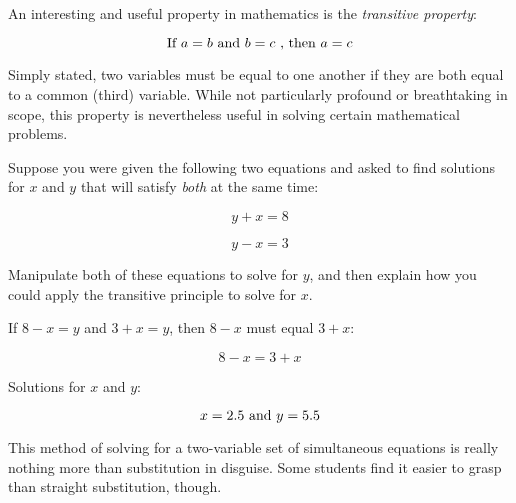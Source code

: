 

An interesting and useful property in mathematics is the {\it transitive property}:

$$\hbox{If } a = b \hbox{ and } b = c \hbox{ , then } a = c$$

Simply stated, two variables must be equal to one another if they are both equal to a common (third) variable.  While not particularly profound or breathtaking in scope, this property is nevertheless useful in solving certain mathematical problems.

\vskip 10pt

Suppose you were given the following two equations and asked to find solutions for $x$ and $y$ that will satisfy {\it both} at the same time:

$$y + x = 8$$

$$y - x = 3$$

Manipulate both of these equations to solve for $y$, and then explain how you could apply the transitive principle to solve for $x$.







If $8 - x = y$ and $3 + x = y$, then $8 - x$ must equal $3 + x$:

$$8 - x = 3 + x$$

Solutions for $x$ and $y$:

$$x = 2.5 \hbox{ and } y = 5.5$$







This method of solving for a two-variable set of simultaneous equations is really nothing more than substitution in disguise.  Some students find it easier to grasp than straight substitution, though.




